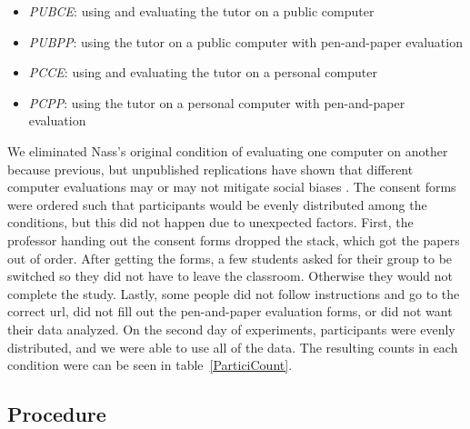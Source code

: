 \documentclass{sig-alternate-05-2015}
\begin{document}
\begin{itemize}
    \item \textit{PUBCE}: using and evaluating the tutor on a public computer 
    \item \textit{PUBPP}: using the tutor on a public computer with pen-and-paper evaluation
    \item \textit{PCCE}: using and evaluating the tutor on a personal computer
    \item \textit{PCPP}: using the tutor on a personal computer with pen-and-paper evaluation
\end{itemize}
We eliminated Nass's original condition of evaluating one computer on another because previous, but unpublished replications have shown that different computer evaluations may or may not mitigate social biases \cite{gownivaripalli}.  The consent forms were ordered such that participants would be evenly distributed among the conditions, but this did not happen due to unexpected factors.  First, the professor handing out the consent forms dropped the stack, which got the papers out of order.  After getting the forms, a few students asked for their group to be switched so they did not have to leave the classroom.  Otherwise they would not complete the study.  Lastly, some people did not follow instructions and go to the correct url, did not fill out the pen-and-paper evaluation forms, or did not want their data analyzed.   On the second day of experiments, participants were evenly distributed, and we were able to use all of the data.  The resulting counts in each condition were can be seen in table~\ref{ParticiCount}. 


\begin{table}[H]
\caption{Breakdown of participants in each condition by day.}
\label{ParticiCount}
\end{table}


\subsection{Procedure}
\end{document}
